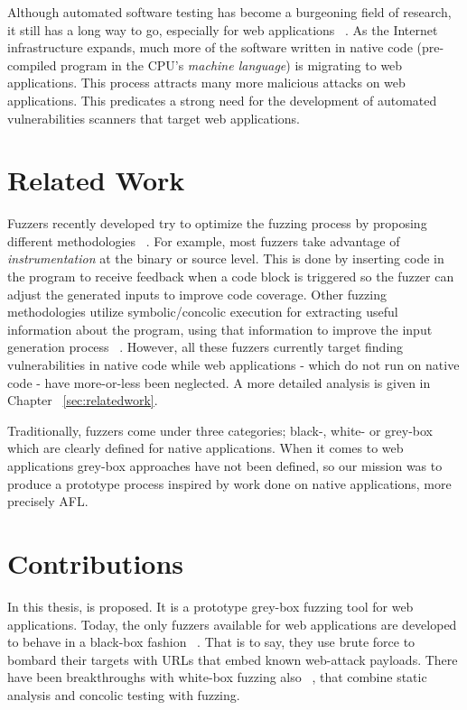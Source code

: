Although automated software testing has become a burgeoning field of research, it still has a long way to go, especially for web applications ~\cite{doupe2010johnny}. As the Internet infrastructure expands, much more of the software written in native code (pre-compiled program in the CPU's \emph{machine language}) is migrating to web applications. This process attracts many more malicious attacks on web applications. This predicates a strong need for the development of automated vulnerabilities scanners that target web applications.
 
\section{Related Work}
Fuzzers recently developed try to optimize the fuzzing process by proposing different methodologies ~\cite{godefroid2012sage, stephens2016driller, rawat2017vuzzer, aschermann2019nautilus, aschermann2019redqueen, hoffman2020Was, osterlund2020parmesan}. 
For example, most fuzzers take advantage of \emph{instrumentation} at the binary or source level. This is done by inserting code in the program to receive feedback when a code block is
triggered so the fuzzer can adjust the generated inputs to improve code coverage. 
Other fuzzing methodologies utilize symbolic/concolic execution for extracting useful information about the program, using that information to improve the input generation process ~\cite{Godefroid2008AutomatedWF,stephens2016driller,godefroid2005dart,godefroid2012sage}. However, all these fuzzers currently target finding vulnerabilities in native code while web applications - which do not run on native code - have more-or-less been neglected. A more detailed analysis is given in Chapter ~\ref{sec:relatedwork}.

Traditionally, fuzzers come under three categories; black-, white- or grey-box which are clearly defined for native applications. When it comes to web applications grey-box approaches have not been defined, so our mission was to produce a prototype process inspired by work done on native applications, more precisely AFL.

\section{Contributions}
In this thesis, \pname{} is proposed. It is a prototype grey-box fuzzing tool for web applications. Today, the only fuzzers available for web applications are developed to behave in a black-box fashion ~\cite{doupe2010johnny}. That is to say, they use brute force to bombard their targets with URLs that embed known web-attack payloads. There have been breakthroughs with white-box fuzzing also ~\cite{navex2018,Borges2018BaZINGAWF}, that combine static analysis and concolic testing with fuzzing.

